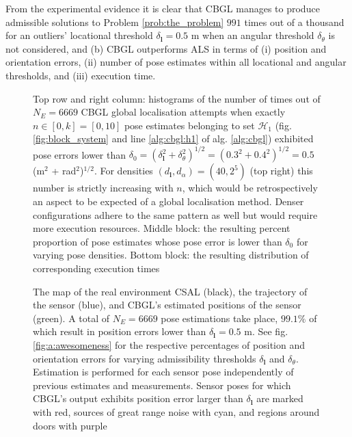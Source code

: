 From the experimental evidence it is clear that CBGL manages to produce
admissible solutions to Problem \ref{prob:the_problem} $991$ times out of a
thousand for an outliers' locational threshold $\delta_{\bm{l}} = 0.5$ m when
an angular threshold $\delta_{\theta}$ is not considered, and (b) CBGL
outperforms ALS in terms of (i) position and orientation errors, (ii) number of
pose estimates within all locational and angular thresholds, and (iii) execution
time.


\begin{figure}
  \vspace{-0.3cm}
  
  \vspace{-0.3cm}
  \caption{\small Top row and right column: histograms of the number of times
           out of $N_E = 6669$ CBGL global localisation attempts
           when exactly $n \in [0,k] = [0,10]$ pose estimates belonging to set
           $\mathcal{H}_1$ (fig. \ref{fig:block_system} and line
           \ref{alg:cbgl:h1} of alg. \ref{alg:cbgl}) exhibited pose errors
           lower than $\delta_0 = (\delta_{\bm{l}}^2 + \delta_{\theta}^2)^{1/2} =
           (0.3^2 + 0.4^2)^{1/2} = 0.5$ (m$^2$ + rad$^2$)$^{1/2}$. For
           densities $(d_{\bm{l}},d_{\alpha}) = (40, 2^5)$ (top right) this
           number is strictly increasing with $n$, which would be
           retrospectively an aspect to be expected of a global localisation
           method. Denser configurations adhere to the same pattern as well but
           would require more execution resources. Middle block: the resulting
           percent proportion of pose estimates whose pose error is lower than
           $\delta_0$ for varying pose densities. Bottom block: the resulting
           distribution of corresponding execution times
           }
  \vspace{-0.5cm}
  \label{fig:a:determine_40_32}
\end{figure}


\begin{figure}
  \vspace{-1.2cm}
  
  \vspace{-0.7cm}
  \caption{\small The map of the real environment CSAL (black), the trajectory
           of the sensor (blue), and CBGL's estimated positions of the sensor
           (green). A total of $N_E = 6669$ pose estimations take place,
           $99.1\%$ of which result in position errors lower than
           $\delta_{\bm{l}} = 0.5$ m. See fig. \ref{fig:a:awesomeness}
           for the respective percentages of position and orientation errors
           for varying admissibility thresholds $\delta_{\bm{l}}$ and
           $\delta_{\theta}$.
           Estimation is performed for each sensor
           pose independently of previous estimates and measurements. Sensor
           poses for which CBGL's output exhibits position error larger than
           $\delta_{\bm{l}}$ are marked with red, sources of great
           range noise with cyan, and regions around doors with purple
           }
  \label{fig:a:map_and_trajectory}
  \vspace{-0.5cm}
\end{figure}


